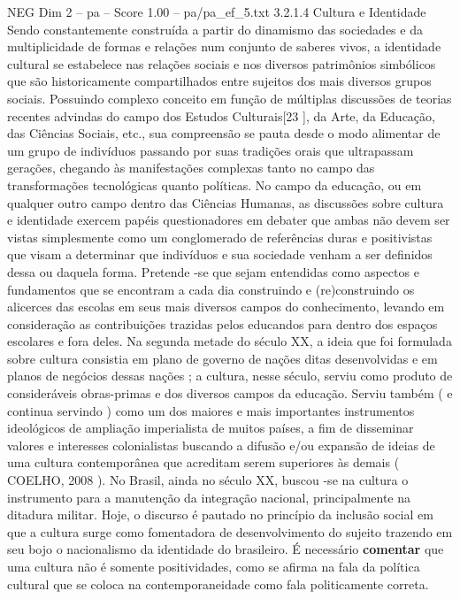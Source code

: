 \begin{textsample}{NEG Dim 2 – pa – Score 1.00 – pa/pa\_ef\_5.txt}  \label{ex:f2_neg_226}
3.2.1.4 Cultura e Identidade Sendo constantemente construída a partir do dinamismo das sociedades e da multiplicidade de formas e relações num conjunto de saberes vivos, a identidade cultural se estabelece nas relações sociais e nos diversos patrimônios simbólicos que são historicamente compartilhados entre sujeitos dos mais diversos grupos sociais.
Possuindo complexo conceito em função de múltiplas discussões de teorias recentes advindas do campo dos Estudos Culturais[23 ], da Arte, da Educação, das Ciências Sociais, etc., sua compreensão se pauta desde o modo alimentar de um grupo de indivíduos passando por suas tradições orais que ultrapassam gerações, chegando às manifestações complexas tanto no campo das transformações tecnológicas quanto políticas.
No campo da educação, ou em qualquer outro campo dentro das Ciências Humanas, as discussões sobre cultura e identidade exercem papéis questionadores em debater que ambas não devem ser vistas simplesmente como um conglomerado de referências duras e positivistas que visam a determinar que indivíduos e sua sociedade venham a ser definidos dessa ou daquela forma.
Pretende -se que sejam entendidas como aspectos e fundamentos que se encontram a cada dia construindo e (re)construindo os alicerces das escolas em seus mais diversos campos do conhecimento, levando em consideração as contribuições trazidas pelos educandos para dentro dos espaços escolares e fora deles.
Na segunda metade do século XX, a ideia que foi formulada sobre cultura consistia em plano de governo de nações ditas desenvolvidas e em planos de negócios dessas nações ; a cultura, nesse século, serviu como produto de consideráveis obras-primas e dos diversos campos da educação.
Serviu também ( e continua servindo ) como um dos maiores e mais importantes instrumentos ideológicos de ampliação imperialista de muitos países, a fim de disseminar valores e interesses colonialistas buscando a difusão e/ou expansão de ideias de uma cultura contemporânea que acreditam serem superiores às demais ( COELHO, 2008 ).
No Brasil, ainda no século XX, buscou -se na cultura o instrumento para a manutenção da integração nacional, principalmente na ditadura militar.
Hoje, o discurso é pautado no princípio da inclusão social em que a cultura surge como fomentadora de desenvolvimento do sujeito trazendo em seu bojo o nacionalismo da identidade do brasileiro.
É necessário \textbf{comentar} que uma cultura não é somente positividades, como se afirma na fala da política cultural que se coloca na contemporaneidade como fala politicamente correta.

\end{textsample}
